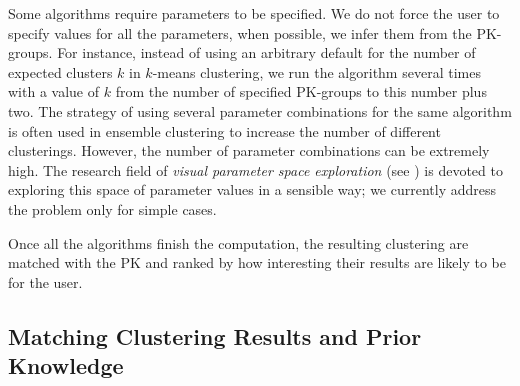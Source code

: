 Some algorithms require parameters to be specified. We do not force the user to specify values for all the parameters, when possible, we infer them from the PK-groups. For instance, instead of using an arbitrary default for the number of expected clusters $k$ in $k$-means clustering, we run the algorithm several times with a value of $k$ from the number of specified PK-groups to this number plus two.
%
The strategy of using several parameter combinations for the same algorithm is often used in ensemble clustering to increase the number of different clusterings.
However, the number of parameter combinations can be extremely high. The research field of \emph{visual parameter space exploration} (see \eg \cite{sedlmairVisualParameterSpace2014}) is devoted to exploring this space of parameter values in a sensible way; we currently address the problem only for simple cases.



Once all the algorithms finish the computation, the resulting clustering are matched with the PK and ranked by how interesting their results are likely to be for the user.


\subsection{Matching Clustering Results and Prior Knowledge}
\label{sec:matching}

